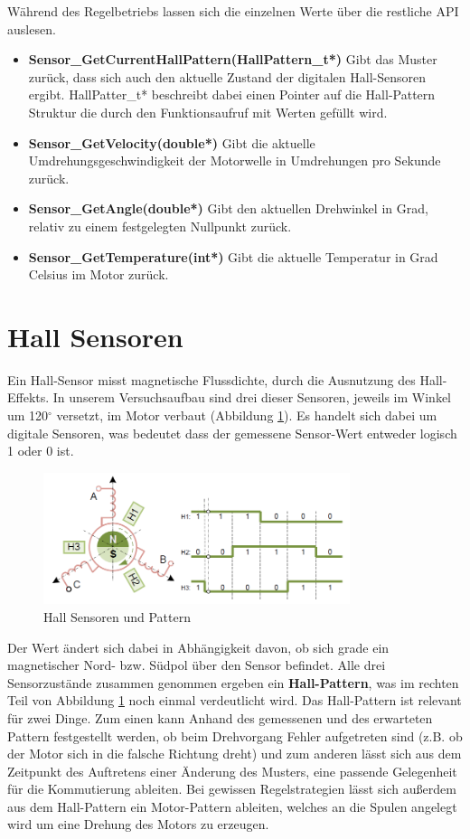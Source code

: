 \noindent
Während des Regelbetriebs lassen sich die einzelnen Werte über die restliche API auslesen.

\begin{itemize}
\item \textbf{Sensor\_GetCurrentHallPattern(HallPattern\_t*)} Gibt das Muster zurück, dass sich auch den aktuelle Zustand der digitalen Hall-Sensoren ergibt. HallPatter\_t* beschreibt dabei einen Pointer auf die Hall-Pattern Struktur die durch den Funktionsaufruf mit Werten gefüllt wird.
\item \textbf{Sensor\_GetVelocity(double*)} Gibt die aktuelle Umdrehungsgeschwindigkeit der Motorwelle in Umdrehungen pro Sekunde zurück.
\item \textbf{Sensor\_GetAngle(double*)} Gibt den aktuellen Drehwinkel in Grad, relativ zu einem festgelegten Nullpunkt zurück.
\item \textbf{Sensor\_GetTemperature(int*)} Gibt die aktuelle Temperatur in Grad Celsius im Motor zurück.
\end{itemize}

\section{Hall Sensoren}
Ein Hall-Sensor misst magnetische Flussdichte, durch die Ausnutzung des Hall-Effekts. In unserem Versuchsaufbau sind drei dieser Sensoren, jeweils im Winkel um 120$^\circ$ versetzt, im Motor verbaut (Abbildung \ref{img:hall_sample}). Es handelt sich dabei um digitale Sensoren, was bedeutet dass der gemessene Sensor-Wert entweder logisch 1 oder 0 ist.

\begin{figure}[h]
\centering
\includegraphics[width=0.8\textwidth]{sensor/hall_sample.PNG}
\caption{Hall Sensoren und Pattern}
\label{img:hall_sample}
\end{figure}

Der Wert ändert sich dabei in Abhängigkeit davon, ob sich grade ein magnetischer Nord- bzw. Südpol über den Sensor befindet. Alle drei Sensorzustände zusammen genommen ergeben ein \textbf{Hall-Pattern}, was im rechten Teil von Abbildung \ref{img:hall_sample} noch einmal verdeutlicht wird. Das Hall-Pattern ist relevant für zwei Dinge. Zum einen kann Anhand des gemessenen und des erwarteten Pattern festgestellt werden, ob beim Drehvorgang Fehler aufgetreten sind (z.B. ob der Motor sich in die falsche Richtung dreht) und zum anderen lässt sich aus dem Zeitpunkt des Auftretens einer Änderung des Musters, eine passende Gelegenheit für die Kommutierung ableiten. Bei gewissen Regelstrategien lässt sich außerdem aus dem Hall-Pattern ein Motor-Pattern ableiten, welches an die Spulen angelegt wird um eine Drehung des Motors zu erzeugen.

